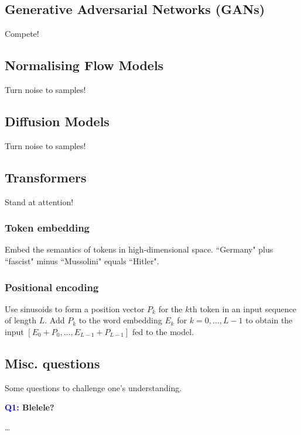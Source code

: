 \documentclass[11pt]{article}
\begin{document}
\subsection{Generative Adversarial Networks (GANs)}
Compete!

\subsection{Normalising Flow Models}
Turn noise to samples!

\subsection{Diffusion Models}
Turn noise to samples!

\subsection{Transformers}
Stand at attention!

\subsubsection{Token embedding}
Embed the semantics of tokens in high-dimensional space. ``Germany" plus ``fascist" minus ``Mussolini" equals ``Hitler".

\subsubsection{Positional encoding}
Use sinusoids to form a position vector $P_k$ for the $k$th token in an input sequence of length $L$. Add $P_k$ to the word embedding $E_k$ for $k=0,\dots,L-1$ to obtain the input $[E_0+P_0,\dots,E_{L-1}+P_{L-1}]$ fed to the model.

\subsection{Misc. questions}

Some questions to challenge one's understanding.

\begin{center}
    \textbf{\textcolor{blue}{Q1:} Blelele?}
\end{center}
\dots

\end{document}
